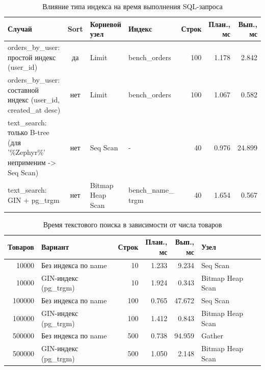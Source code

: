 \begin{table}[H]
\centering
\scriptsize
\caption{Влияние типа индекса на время выполнения SQL-запроса}
\label{tbl:research_type}
\begin{tabular}{|p{}|c|p{}|p{}|r|r|r|}
\hline
Случай & Sort & \makecell{Корневой\\узел} & Индекс & Строк & \makecell{План.,\\мс} & \makecell{Вып.,\\мс} \\ \hline
orders\_by\_user: простой индекс (user\_id) & да & Limit & bench\_orders & 100 & 1.178 & 2.842 \\ \hline
orders\_by\_user: составной индекс (user\_id, created\_at desc) & нет & Limit & bench\_orders & 100 & 1.067 & 0.582 \\ \hline
text\_search: только B-tree (для '\%Zephyr\%' неприменим -> Seq Scan) & нет & Seq Scan & - & 40 & 0.976 & 24.899 \\ \hline
text\_search: GIN + pg\_trgm & нет & Bitmap Heap Scan & \makecell[l]{bench\_name\_\\trgm} & 40 & 1.654 & 0.567 \\ \hline
\end{tabular}
\end{table}

\begin{table}[H]
\centering
\small
\caption{Время текстового поиска в зависимости от числа товаров}
\label{tbl:research_scaling}
\begin{tabular}{|r|p{}|r|r|r|p{}|}
\hline
Товаров & Вариант & Строк & \makecell{План.,\\мс} & \makecell{Вып.,\\мс} & Узел \\ \hline
10000 & Без индекса по name & 10 & 1.233 & 9.234 & Seq Scan \\ \hline
10000 & GIN-индекс (pg\_trgm) & 10 & 1.924 & 0.343 & Bitmap Heap Scan \\ \hline
100000 & Без индекса по name & 100 & 0.765 & 47.672 & Seq Scan \\ \hline
100000 & GIN-индекс (pg\_trgm) & 100 & 1.412 & 0.843 & Bitmap Heap Scan \\ \hline
500000 & Без индекса по name & 500 & 0.738 & 94.959 & Gather \\ \hline
500000 & GIN-индекс (pg\_trgm) & 500 & 1.050 & 2.148 & Bitmap Heap Scan \\ \hline
\end{tabular}
\end{table}

